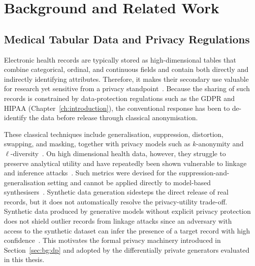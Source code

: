 
\chapter{Background and Related Work}
\label{ch:background}


\section{Medical Tabular Data and Privacy Regulations}
\label{sec:bg:regulations}

Electronic health records are typically stored as high-dimensional tables that
combine categorical, ordinal, and continuous fields and contain both directly
and indirectly identifying attributes. Therefore, it makes their secondary use valuable
for research yet sensitive from a privacy standpoint~\cite{Murtaza2023}. Because
the sharing of such records is constrained by data-protection regulations such
as the GDPR and HIPAA (Chapter~\ref{ch:introduction}), the conventional response
has been to de-identify the data before release through classical anonymisation.

These classical techniques include generalisation, suppression, distortion,
swapping, and masking, together with privacy models such as $k$-anonymity and
$\ell$-diversity~\cite{anonymization,park2013perturbed}. On high dimensional
health data, however, they struggle to preserve analytical utility and have
repeatedly been shown vulnerable to linkage and inference
attacks~\cite{anonymization,Murtaza2023}. Such metrics were 
devised for the suppression-and-generalisation
setting and cannot be applied directly to model-based
synthesisers~\cite{park2013perturbed}.
Synthetic data generation sidesteps the direct release of real records, but it
does not automatically resolve the privacy-utility trade-off. Synthetic 
data produced by generative models without explicit privacy
protection does not shield outlier records from linkage attacks since an
adversary with access to the synthetic dataset can infer the presence of a
target record with high confidence~\cite{stadler2022synthetic}. This motivates
the formal privacy machinery introduced in Section~\ref{sec:bg:dp} and adopted
by the differentially private generators evaluated in this thesis.

